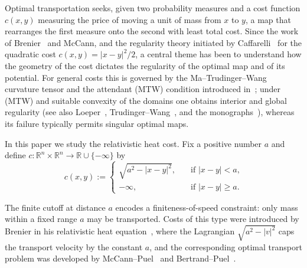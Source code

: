 \documentclass[12pt,letterpaper]{amsart}
\theoremstyle{definition}
\theoremstyle{plain}
\numberwithin{equation}{section}
\newcommand{\R}{\mathbb{R}}
\begin{document}
Optimal transportation seeks, given two probability measures and a cost function
$c(x,y)$ measuring the price of moving a unit of mass from $x$ to $y$, a map that
rearranges the first measure onto the second with least total cost.
Since the work of Brenier~\cite{Br91} and McCann, and the regularity theory initiated by
Caffarelli~\cite{Ca92} for the quadratic cost $c(x,y)=|x-y|^2/2$, a central theme has been
to understand how the geometry of the cost dictates the regularity of the optimal map and
of its potential.
For general costs this is governed by the Ma--Trudinger--Wang curvature tensor and the
attendant (MTW) condition introduced in~\cite{MTW05}; under (MTW) and suitable
convexity of the domains one obtains interior and global regularity
(see also Loeper~\cite{Lo09}, Trudinger--Wang~\cite{TW09}, and the
monographs~\cite{Vi09,Fi17}), whereas its failure typically permits singular optimal maps.

In this paper we study the relativistic heat cost.
Fix a positive number $a$ and define $c:\R^n\times\R^n\to\R\cup\{-\infty\}$ by
\begin{equation}\label{eq:cost}
    c(x,y):=\left\{\begin{aligned}
    \sqrt{a^2-|x-y|^2},\quad &\text{if $|x-y|<a$,}\\
    -\infty,\quad &\text{if $|x-y|\geq a$.}
    \end{aligned}
    \right.
\end{equation}

The finite cutoff at distance $a$ encodes a finiteness-of-speed constraint: only mass within
a fixed range $a$ may be transported.
Costs of this type were introduced by Brenier in his relativistic heat
equation~\cite{Br03}, where the Lagrangian $\sqrt{a^2-|v|^2}$ caps the transport velocity by
the constant $a$, and the corresponding optimal transport problem was developed by
McCann--Puel~\cite{MP09} and Bertrand--Puel~\cite{BP13}.

\end{document}
